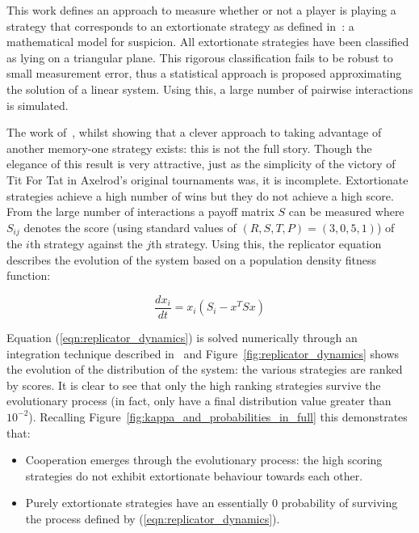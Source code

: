 \documentclass[a4paper]{article}
\begin{document}
This work defines an approach to measure whether or not a player is playing a
strategy that corresponds to an extortionate strategy as defined
in~\cite{Press2012}: a mathematical model for suspicion. All extortionate
strategies have been classified as lying on a triangular plane.  This rigorous
classification fails to be robust to small measurement error, thus a statistical
approach is proposed approximating the solution of a linear system. Using this,
a large number of pairwise interactions is simulated.

The work of~\cite{Press2012}, whilst showing that a clever approach to taking
advantage of another memory-one strategy exists: this is not the full story.
Though the elegance of this result is very attractive, just as the simplicity of
the victory of Tit For Tat in Axelrod's original tournaments was, it is
incomplete.  Extortionate strategies achieve a high number of wins but they do
not achieve a high score.
From the large number of interactions a payoff matrix \(S\)
can be measured where \(S_{ij}\) denotes the score (using standard values of
\((R, S, T, P) = (3, 0, 5, 1)\)) of the \(i\)th strategy against the \(j\)th
strategy. Using this, the replicator equation describes the evolution of the
system based on a population density fitness function:

\begin{equation}\label{eqn:replicator_dynamics}
    \frac{dx_i}{dt} = x_i(S_i-x^TS x)
\end{equation}

Equation (\ref{eqn:replicator_dynamics}) is solved numerically through an
integration technique described in~\cite{Petzold1983} and
Figure~\ref{fig:replicator_dynamics} shows the evolution of the distribution of
the system: the various strategies are ranked by scores. It is clear to see that
only the high ranking strategies survive the evolutionary process (in fact,
only 
have a final distribution value greater than \(10 ^ {-2}\)). Recalling
Figure~\ref{fig:kappa_and_probabilities_in_full} this demonstrates that:

\begin{itemize}
    \item Cooperation emerges through the evolutionary process: the high scoring
        strategies do not exhibit extortionate behaviour towards each other.
    \item Purely extortionate strategies have an essentially 0 probability of
        surviving the process defined by (\ref{eqn:replicator_dynamics}).
\end{itemize}
\end{document}
